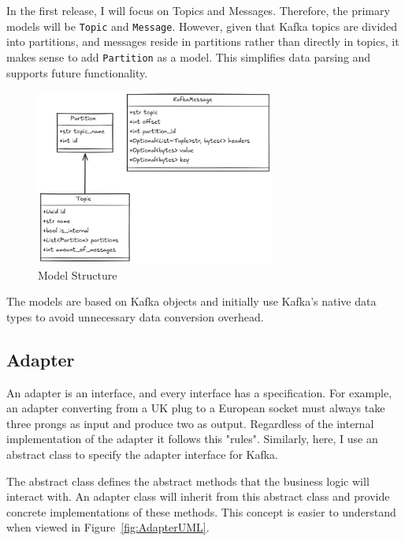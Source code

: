 \documentclass[10pt , a4paper]{report}
\begin{document}
In the first release, I will focus on Topics and Messages. Therefore, the primary models will be \texttt{Topic} and \texttt{Message}. However, given that Kafka topics are divided into partitions, and messages reside in partitions rather than directly in topics, it makes sense to add \texttt{Partition} as a model. This simplifies data parsing and supports future functionality.

\begin{figure}[htbp]
  \begin{center}
    \includegraphics[width=0.7\textwidth]{imgs/Models.png}
  \end{center}
  \caption{Model Structure}\label{fig:models}
\end{figure}

The models are based on Kafka objects and initially use Kafka's native data types to avoid unnecessary data conversion overhead.

\newpage
\subsection{Adapter}\label{subsec:Adapter}

An adapter is an interface, and every interface has a specification. For example, an adapter converting from a UK plug to a European socket must always take three prongs as input and produce two as output. Regardless of the internal implementation of the adapter it follows this "rules". Similarly, here, I use an abstract class to specify the adapter interface for Kafka.

The abstract class defines the abstract methods that the business logic will interact with. An adapter class will inherit from this abstract class and provide concrete implementations of these methods. This concept is easier to understand when viewed in Figure~\ref{fig:AdapterUML}.
\end{document}
